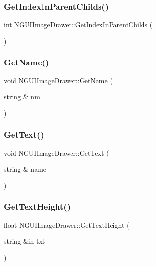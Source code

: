 \subsubsection{\texorpdfstring{Get\+Index\+In\+Parent\+Childs()}{GetIndexInParentChilds()}}
{\footnotesize\ttfamily int N\+G\+U\+I\+Image\+Drawer\+::\+Get\+Index\+In\+Parent\+Childs (\begin{DoxyParamCaption}{ }\end{DoxyParamCaption})}

\hypertarget{class_n_g_u_i_image_drawer_a04c25ce95748fcb9f3c0298160fa43ef}{}\label{class_n_g_u_i_image_drawer_a04c25ce95748fcb9f3c0298160fa43ef} 
\subsubsection{\texorpdfstring{Get\+Name()}{GetName()}}
{\footnotesize\ttfamily void N\+G\+U\+I\+Image\+Drawer\+::\+Get\+Name (\begin{DoxyParamCaption}\item[{string \&}]{nm }\end{DoxyParamCaption})}

\hypertarget{class_n_g_u_i_image_drawer_ab536c59b63703dc1d6184bbd43a2e4a4}{}\label{class_n_g_u_i_image_drawer_ab536c59b63703dc1d6184bbd43a2e4a4} 
\subsubsection{\texorpdfstring{Get\+Text()}{GetText()}}
{\footnotesize\ttfamily void N\+G\+U\+I\+Image\+Drawer\+::\+Get\+Text (\begin{DoxyParamCaption}\item[{string \&}]{name }\end{DoxyParamCaption})}

\hypertarget{class_n_g_u_i_image_drawer_a8d951ab093150a2fa82ff2968e5d5cef}{}\label{class_n_g_u_i_image_drawer_a8d951ab093150a2fa82ff2968e5d5cef} 
\subsubsection{\texorpdfstring{Get\+Text\+Height()}{GetTextHeight()}}
{\footnotesize\ttfamily float N\+G\+U\+I\+Image\+Drawer\+::\+Get\+Text\+Height (\begin{DoxyParamCaption}\item[{string \&in}]{txt }\end{DoxyParamCaption})}

